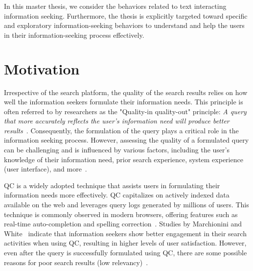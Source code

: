In this master thesis, we consider the behaviors related to text interacting information seeking. Furthermore, the thesis is explicitly targeted toward specific and exploratory information-seeking behaviors to understand and help the users in their information-seeking process effectively.

\section{Motivation}

Irrespective of the search platform, the quality of the search results relies on how well the information seekers formulate their information needs. This principle is often referred to by researchers as the "Quality-in quality-out" principle: \textit{A query that more accurately reflects the user's information need will produce better results}~\cite{croft1987i3r}. Consequently, the formulation of the query plays a critical role in the information seeking process. However, assessing the quality of a formulated query can be challenging and is influenced by various factors, including the user's knowledge of their information need, prior search experience, system experience (user interface), and more~\cite{marchionini2007find}.

 \ac{QC} is a widely adopted technique that assists users in formulating their information needs more effectively. \ac{QC} capitalizes on actively indexed data available on the web and leverages query logs generated by millions of users. This technique is commonly observed in modern browsers, offering features such as real-time auto-completion and spelling correction~\cite{bast2006type, gaizauskas1998information}. Studies by Marchionini and White~\cite{marchionini2007find} indicate that information seekers show better engagement in their search activities when using \ac{QC}, resulting in higher levels of user satisfaction. However, even after the query is successfully formulated using \ac{QC}, there are some possible reasons for poor search results (low relevancy)~\cite{azad2019query}. 

